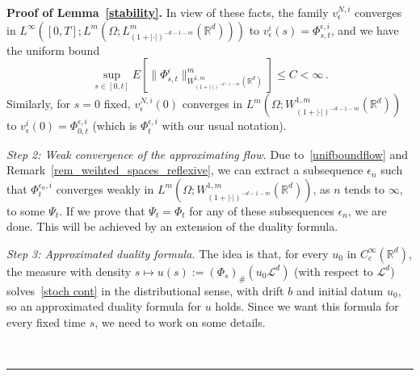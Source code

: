 \documentclass[a4paper,10pt]{article}
\newenvironment{proof}[1][Proof]{\noindent\textbf{#1.} }{\ \rule{0.5em}{0.5em}}
\newcommand{\mr}{\mathbb{R}}
\newcommand{\mc}{\mathcal}
\newcommand{\eps}{\epsilon}
\begin{document}
\begin{proof}[Proof of Lemma~\ref{stability}]
In view of these facts, the family $v^{N,i}_\eps$ converges in $L^\infty([0,T];L^m(\Omega;L^m_{(1+|\cdot|)^{-d-1-m}}(\mr^d)))$ to $v^{i}_\eps(s)=\Phi_{s,t}^{\eps,i}$, and we have the uniform bound
\begin{equation}
\sup_{s\in[0,t]}E[\|\Phi_{s,t}^\eps\|^m_{W^{1,m}_{(1+|\cdot|)^{-d-1-m}}(\mr^d)}]\le C<\infty \,.\label{unifboundflow}
\end{equation}
Similarly, for $s=0$ fixed, $v^{N,i}_\eps(0)$ converges in $L^m(\Omega;W^{1,m}_{(1+|\cdot|)^{-d-1-m}}(\mr^d))$ to $v_\eps^{i}(0)=\Phi_{0,t}^{\eps,i}$ (which is $\Phi_t^{\eps,i}$ with our usual notation).

\emph{Step 2: Weak convergence of the approximating flow.} Due to~\eqref{unifboundflow} and Remark~\ref{rem_weihted_spaces_reflexive}, we can extract a subsequence $\eps_n$ such that $\Phi^{\eps_n,i}_t$ converges weakly in $L^m(\Omega;W^{1,m}_{(1+|\cdot|)^{-d-1-m}}(\mr^d))$, as $n$ tends to $\infty$, to some $\Psi_t$. If we prove that $\Psi_t=\Phi_t$ for any of these subsequences $\eps_n$, we are done. This will be achieved by an extension of the duality formula.

\emph{Step 3: Approximated duality formula.} The idea is that, for every $u_0$ in $C^\infty_c(\mr^d)$, the measure with density $s\mapsto u(s):=(\Phi_s)_\#(u_0\mc{L}^d)$ (with respect to $\mc{L}^d$) solves~\eqref{stoch cont} in the distributional sense, with drift $b$ and initial datum $u_0$, so an approximated duality formula for $u$ holds. Since we want this formula for every fixed time $s$, we need to work on some details.


\end{proof}
\end{document}
